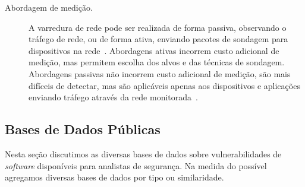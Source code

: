 \begin{description}
  \item[Abordagem de medição.] A varredura de rede pode ser realizada de forma passiva, observando o tráfego de rede, ou de forma ativa, enviando pacotes de sondagem para dispositivos na rede~\cite{beverly10hifreq, luckie13speedtrap, xia2005efficient, you2019profuzzer}. Abordagens ativas incorrem custo adicional de medição, mas permitem escolha dos alvos e das técnicas de sondagem. Abordagens passivas não incorrem custo adicional de medição, são mais difíceis de detectar, mas são aplicáveis apenas aos dispositivos e aplicações enviando tráfego através da rede monitorada~\cite{yao10traceback, yao15traceback, hiesgen2022spoki}.

\end{description}

\subsection{Bases de Dados Públicas}\label{sec:art.data}

Nesta seção discutimos as diversas bases de dados sobre vulnerabilidades de \emph{software} disponíveis para analistas de segurança. Na medida do possível agregamos diversas bases de dados por tipo ou similaridade.

